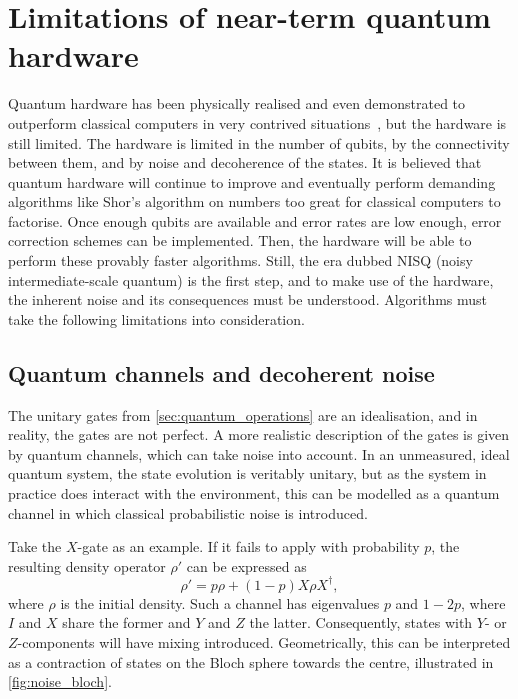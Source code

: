 \section{Limitations of near-term quantum hardware}
\label{sec:nisq}
Quantum hardware has been physically realised and even demonstrated to outperform classical computers in very contrived situations~\autocite{arute2019, zhong2020, madsen2022}, but the hardware is still limited.
The hardware is limited in the number of qubits, by the connectivity between them, and by noise and decoherence of the states.
It is believed that quantum hardware will continue to improve and eventually perform demanding algorithms like Shor's algorithm on numbers too great for classical computers to factorise.
Once enough qubits are available and error rates are low enough, error correction schemes can be implemented.
Then, the hardware will be able to perform these provably faster algorithms.
Still, the era dubbed NISQ (noisy intermediate-scale quantum) is the first step, and to make use of the hardware, the inherent noise and its consequences must be understood.
Algorithms must take the following limitations into consideration.

\subsection{Quantum channels and decoherent noise}
The unitary gates from \cref{sec:quantum_operations} are an idealisation, and in reality, the gates are not perfect.
A more realistic description of the gates is given by quantum channels, which can take noise into account.
In an unmeasured, ideal quantum system, the state evolution is veritably unitary, but as the system in practice does interact with the environment, this can be modelled as a quantum channel in which classical probabilistic noise is introduced.

Take the $X$-gate as an example.
If it fails to apply with probability $p$, the resulting density operator $\rho'$ can be expressed as
\begin{equation}
  \rho' = p\rho + (1-p)X\rho X^\dagger,
\end{equation}
where $\rho$ is the initial density.
Such a channel has eigenvalues $p$ and $1-2p$, where $I$ and $X$ share the former and $Y$ and $Z$ the latter.
Consequently, states with $Y$- or $Z$-components will have mixing introduced.
Geometrically, this can be interpreted as a contraction of states on the Bloch sphere towards the centre, illustrated in \cref{fig:noise_bloch}.

